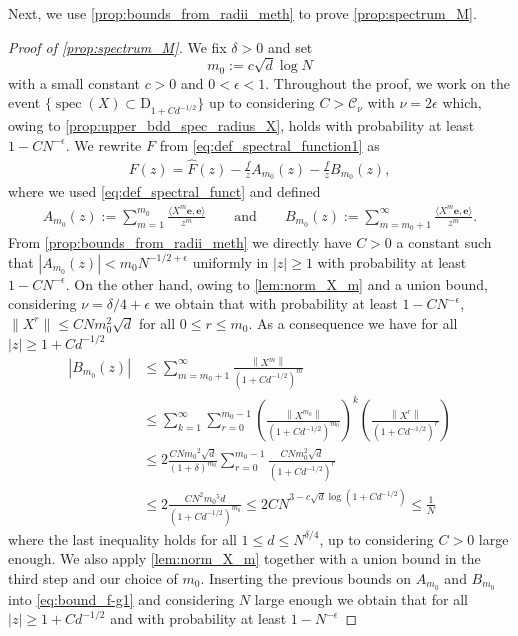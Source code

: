 \documentclass[11pt]{article}
\DeclareMathOperator{\spec}{spec}
\newcommand{\abs}[1]{\left| #1 \right|}
\newcommand{\norm}[1]{\left\| #1 \right\|}
\theoremstyle{plain}
\theoremstyle{remark}
\numberwithin{equation}{section}
\begin{document}
Next, we use \cref{prop:bounds_from_radii_meth} to prove \cref{prop:spectrum_M}.  
\begin{proof}[Proof of \cref{prop:spectrum_M}]
    We fix $\delta >0$ and set 
    \begin{equation*}
        m_0:= c \sqrt{d} \log N
    \end{equation*}
    with a small constant $c>0$ and $0<\epsilon<1$. Throughout the proof, we work on the event $\{\spec(X) \subset \mathrm{D}_{1+C d^{-1/2}}\}$ up to considering $C> \mathcal{C}_{\nu} $ with $\nu = 2 \epsilon$ which, owing to  \cref{prop:upper_bdd_spec_radius_X}, holds with probability at least $1 - CN^{-\epsilon}$. We rewrite $F$ from \cref{eq:def_spectral_function1} as
    \begin{align}\label{eq:bound_f-g1}
        F(z) = \widehat{F}(z) - \frac{f}{z} A_{m_0}(z) - \frac{f}{z} B_{m_0}(z), 
    \end{align}
    where we used \eqref{eq:def_spectral_funct} and defined
    \begin{align*}
        A_{m_0} (z) := \sum_{m=1}^{m_0} \frac{\langle X^m \mathbf e, \mathbf e\rangle}{z^m} \qquad \text{and} \qquad B_{m_0} (z) := \sum_{m={m_0}+1}^\infty \frac{\langle X^m \mathbf e, \mathbf e\rangle}{z^m}.
    \end{align*}
   From \cref{prop:bounds_from_radii_meth} we directly have $C>0$ a constant such that $|A_{m_0}(z)| <  m_{0}N^{-1/2+\epsilon}$ uniformly in $\abs{z} \ge 1$ with probability at least $1 - CN^{-\epsilon}$. On the other hand, owing to \cref{lem:norm_X_m} and a union bound, considering $\nu = \delta/4 + \epsilon$ we obtain that with probability at least $1- CN^{-\epsilon}$, $\|X^r\| \le CNm_0^2\sqrt{d}$ for all $0 \le r \le m_{0}$. As a consequence we have for all $\abs{z} \ge 1+ C d^{-1/2} $
   \begin{align*}
       \abs{B_{m_0}(z)} &\le \sum_{m=m_0+1}^\infty \frac{\norm{X^m}}{(1+ C d^{-1/2} )^m} \\ 
       & \le \sum_{k=1}^\infty \sum_{r=0}^{m_0-1} \left(\frac{\norm{X^{m_0}}}{{(1+ C d^{-1/2} )^{m_0}}}\right)^k\left(\frac{\norm{X^r}}{(1+ C d^{-1/2} )^r}\right)\\
       &\le 2\frac{CN{m_0}^2\sqrt{d}}{(1+\delta)^{m_0}}\sum_{r=0}^{{m_0}-1}\frac{CNm_0^2\sqrt{d}}{(1+ C d^{-1/2} )^r} \\ 
       & \le  2\frac{CN^2{m_0}^5d}{(1+ C d^{-1/2} )^{m_0}}  \le 2CN^{ 3-  c \sqrt{d}  \log (1+ C d^{-1/2} )} \le \frac{1}{N}
   \end{align*}
where the last inequality holds for all $1 \le d \le N^{\delta/4}$, up to considering $ C >0$ large enough. We also apply \cref{lem:norm_X_m} together with a union bound in the third step and our choice of $m_0$. Inserting the previous bounds on $A_{m_0}$ and $B_{m_0}$ into \eqref{eq:bound_f-g1} and considering $N$ large enough we obtain that for all $  \abs{z} \ge 1+ C d^{-1/2}$ and with probability at least $1-N^{-\epsilon}$

\end{proof}
\end{document}
